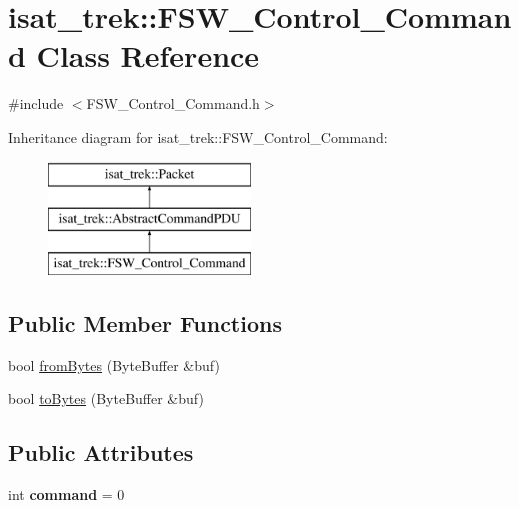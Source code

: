 \hypertarget{classisat__trek_1_1_f_s_w___control___command}{}\section{isat\+\_\+trek\+:\+:F\+S\+W\+\_\+\+Control\+\_\+\+Command Class Reference}
\label{classisat__trek_1_1_f_s_w___control___command}


{\ttfamily \#include $<$F\+S\+W\+\_\+\+Control\+\_\+\+Command.\+h$>$}

Inheritance diagram for isat\+\_\+trek\+:\+:F\+S\+W\+\_\+\+Control\+\_\+\+Command\+:\begin{figure}[H]
\begin{center}
\leavevmode
\includegraphics[height=3.000000cm]{classisat__trek_1_1_f_s_w___control___command}
\end{center}
\end{figure}
\subsection*{Public Member Functions}
\begin{DoxyCompactItemize}
\item 
bool \hyperlink{classisat__trek_1_1_f_s_w___control___command_a53c2b5279e7d4db07b1d715593b5b5fe}{from\+Bytes} (Byte\+Buffer \&buf)
\item 
bool \hyperlink{classisat__trek_1_1_f_s_w___control___command_ada517ac287c68e7a85bf600f2152a934}{to\+Bytes} (Byte\+Buffer \&buf)
\end{DoxyCompactItemize}
\subsection*{Public Attributes}
\begin{DoxyCompactItemize}
\item 
int {\bfseries command} = 0\hypertarget{classisat__trek_1_1_f_s_w___control___command_a96f5a05311f108f0ebcf07e53905b4cf}{}\label{classisat__trek_1_1_f_s_w___control___command_a96f5a05311f108f0ebcf07e53905b4cf}

\end{DoxyCompactItemize}


